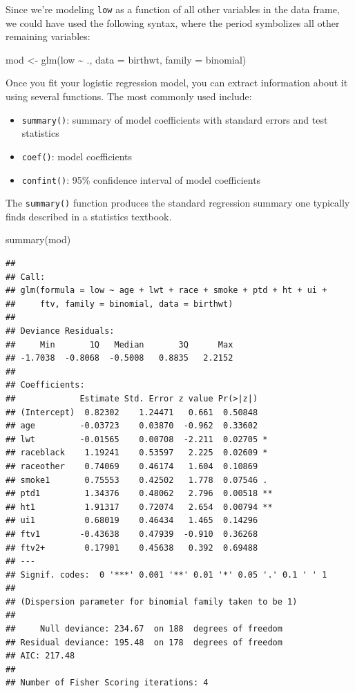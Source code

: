 \documentclass[
]{book}
\newenvironment{Shaded}{\begin{snugshade}}{\end{snugshade}}
\newcommand{\AttributeTok}[1]{\textcolor[rgb]{0.77,0.63,0.00}{#1}}
\newcommand{\FunctionTok}[1]{\textcolor[rgb]{0.00,0.00,0.00}{#1}}
\newcommand{\NormalTok}[1]{#1}
\newcommand{\OtherTok}[1]{\textcolor[rgb]{0.56,0.35,0.01}{#1}}
\newcommand{\SpecialCharTok}[1]{\textcolor[rgb]{0.00,0.00,0.00}{#1}}
\providecommand{\tightlist}{%
  \setlength{\itemsep}{0pt}\setlength{\parskip}{0pt}}
\begin{document}
Since we're modeling \texttt{low} as a function of all other variables in the data frame, we could have used the following syntax, where the period symbolizes all other remaining variables:

\begin{Shaded}
\begin{Highlighting}[]
\NormalTok{mod }\OtherTok{\textless{}{-}} \FunctionTok{glm}\NormalTok{(low }\SpecialCharTok{\textasciitilde{}}\NormalTok{ ., }\AttributeTok{data =}\NormalTok{ birthwt, }\AttributeTok{family =}\NormalTok{ binomial)}
\end{Highlighting}
\end{Shaded}

Once you fit your logistic regression model, you can extract information about it using several functions. The most commonly used include:

\begin{itemize}
\tightlist
\item
  \texttt{summary()}: summary of model coefficients with standard errors and test statistics
\item
  \texttt{coef()}: model coefficients
\item
  \texttt{confint()}: 95\% confidence interval of model coefficients
\end{itemize}

The \texttt{summary()} function produces the standard regression summary one typically finds described in a statistics textbook.

\begin{Shaded}
\begin{Highlighting}[]
\FunctionTok{summary}\NormalTok{(mod)}
\end{Highlighting}
\end{Shaded}

\begin{verbatim}
## 
## Call:
## glm(formula = low ~ age + lwt + race + smoke + ptd + ht + ui + 
##     ftv, family = binomial, data = birthwt)
## 
## Deviance Residuals: 
##     Min       1Q   Median       3Q      Max  
## -1.7038  -0.8068  -0.5008   0.8835   2.2152  
## 
## Coefficients:
##             Estimate Std. Error z value Pr(>|z|)   
## (Intercept)  0.82302    1.24471   0.661  0.50848   
## age         -0.03723    0.03870  -0.962  0.33602   
## lwt         -0.01565    0.00708  -2.211  0.02705 * 
## raceblack    1.19241    0.53597   2.225  0.02609 * 
## raceother    0.74069    0.46174   1.604  0.10869   
## smoke1       0.75553    0.42502   1.778  0.07546 . 
## ptd1         1.34376    0.48062   2.796  0.00518 **
## ht1          1.91317    0.72074   2.654  0.00794 **
## ui1          0.68019    0.46434   1.465  0.14296   
## ftv1        -0.43638    0.47939  -0.910  0.36268   
## ftv2+        0.17901    0.45638   0.392  0.69488   
## ---
## Signif. codes:  0 '***' 0.001 '**' 0.01 '*' 0.05 '.' 0.1 ' ' 1
## 
## (Dispersion parameter for binomial family taken to be 1)
## 
##     Null deviance: 234.67  on 188  degrees of freedom
## Residual deviance: 195.48  on 178  degrees of freedom
## AIC: 217.48
## 
## Number of Fisher Scoring iterations: 4
\end{verbatim}
\end{document}
